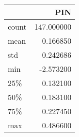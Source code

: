 \begin{tabular}{lr}
\toprule
{} &         PIN \\
\midrule
count &  147.000000 \\
mean  &    0.166850 \\
std   &    0.242686 \\
min   &   -2.573200 \\
25\%   &    0.132100 \\
50\%   &    0.183100 \\
75\%   &    0.227450 \\
max   &    0.486600 \\
\bottomrule
\end{tabular}
